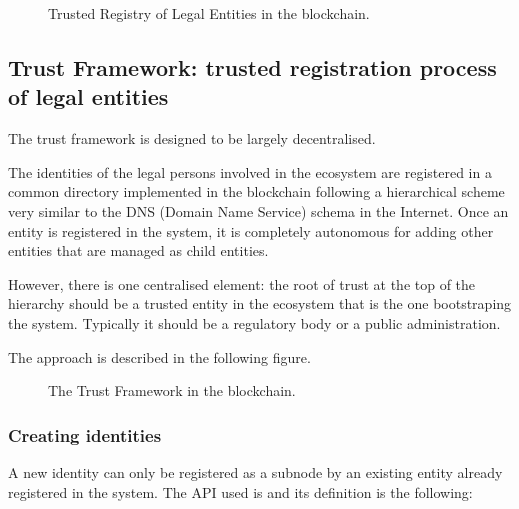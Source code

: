 \documentclass[a4paper,12pt,english,openany]{sphinxmanual}
\begin{document}
\begin{figure}[htbp]
\centering
\capstart

\noindent{}
\caption{Trusted Registry of Legal Entities in the blockchain.}\label{\detokenize{privacycred:id4}}\end{figure}


\subsection{Trust Framework: trusted registration process of legal entities}
\label{\detokenize{privacycred:trust-framework-trusted-registration-process-of-legal-entities}}
\sphinxAtStartPar
The trust framework is designed to be largely decentralised.

\sphinxAtStartPar
The identities of the legal persons involved in the ecosystem are registered in a common directory implemented in the blockchain following a hierarchical scheme very similar to the DNS (Domain Name Service) schema in the Internet. Once an entity is registered in the system, it is completely autonomous for adding other entities that are managed as child entities.

\sphinxAtStartPar
However, there is one centralised element: the root of trust at the top of the hierarchy should be a trusted entity in the ecosystem that is the one bootstraping the system. Typically it should be a regulatory body or a public administration.

\sphinxAtStartPar
The approach is described in the following figure.

\begin{figure}[htbp]
\centering
\capstart

\noindent{}
\caption{The Trust Framework in the blockchain.}\label{\detokenize{privacycred:id5}}\end{figure}


\subsubsection{Creating identities}
\label{\detokenize{privacycred:creating-identities}}
\sphinxAtStartPar
A new identity can only be registered as a sub\sphinxhyphen{}node by an existing entity already registered in the system. The API used is  and its definition is the following:
\end{document}
